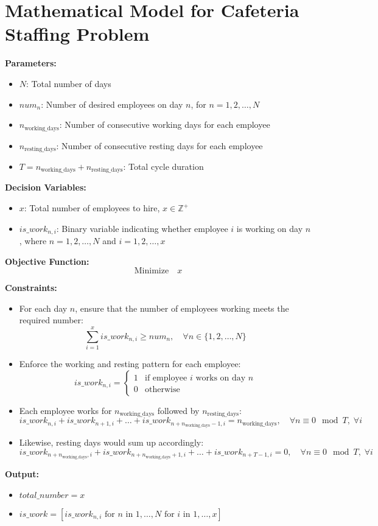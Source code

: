 \documentclass{article}
\begin{document}
\section*{Mathematical Model for Cafeteria Staffing Problem}

\textbf{Parameters:}
\begin{itemize}
    \item $N$: Total number of days
    \item $num_n$: Number of desired employees on day $n$, for $n = 1, 2, \ldots, N$
    \item $n_{\text{working\_days}}$: Number of consecutive working days for each employee
    \item $n_{\text{resting\_days}}$: Number of consecutive resting days for each employee
    \item $T = n_{\text{working\_days}} + n_{\text{resting\_days}}$: Total cycle duration
\end{itemize}

\textbf{Decision Variables:}
\begin{itemize}
    \item $x$: Total number of employees to hire, $x \in \mathbb{Z}^+$
    \item $is\_work_{n,i}$: Binary variable indicating whether employee $i$ is working on day $n$, where $n = 1, 2, \ldots, N$ and $i = 1, 2, \ldots, x$
\end{itemize}

\textbf{Objective Function:}
\[
\text{Minimize} \quad x
\]

\textbf{Constraints:}
\begin{itemize}
    \item For each day $n$, ensure that the number of employees working meets the required number:
    \[
    \sum_{i=1}^{x} is\_work_{n,i} \geq num_n, \quad \forall n \in \{1, 2, \ldots, N\}
    \]
    
    \item Enforce the working and resting pattern for each employee:
    \[
    is\_work_{n,i} = 
    \begin{cases}
    1 & \text{if employee } i \text{ works on day } n \\
    0 & \text{otherwise}
    \end{cases}
    \]

    \item Each employee works for $n_{\text{working\_days}}$ followed by $n_{\text{resting\_days}}$:
    \[
    is\_work_{n,i} + is\_work_{n+1,i} + \ldots + is\_work_{n + n_{\text{working\_days}} - 1,i} = n_{\text{working\_days}}, \quad \forall n \equiv 0 \mod T, \; \forall i
    \]
    
    \item Likewise, resting days would sum up accordingly:
    \[
    is\_work_{n + n_{\text{working\_days}},i} + is\_work_{n + n_{\text{working\_days}} + 1,i} + \ldots + is\_work_{n + T - 1,i} = 0, \quad \forall n \equiv 0 \mod T, \; \forall i
    \]
\end{itemize}

\textbf{Output:}
\begin{itemize}
    \item $total\_number = x$
    \item $is\_work = [is\_work_{n,i} \text{ for } n \text{ in } 1, \ldots, N \text{ for } i \text{ in } 1, \ldots, x]$
\end{itemize}
\end{document}
